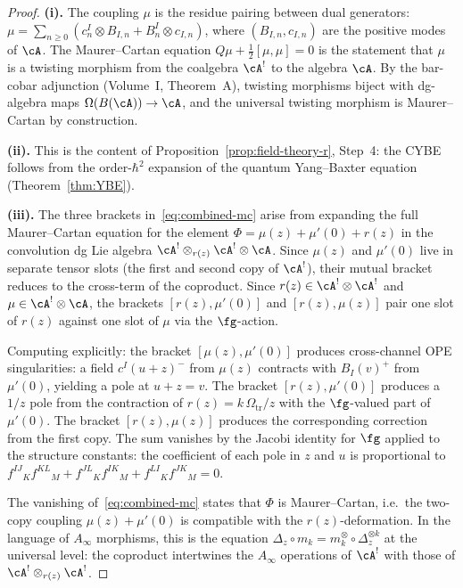 \begin{proof}
\textbf{(i).}
The coupling $\mu$ is the residue pairing between dual generators:
$\mu = \sum_{n \ge 0}(c^I_n \otimes B_{I,n} + B^I_n \otimes c_{I,n})$,
where $(B_{I,n}, c_{I,n})$ are the positive modes of $\cA$.
The Maurer--Cartan equation $Q\mu + \tfrac{1}{2}[\mu, \mu] = 0$ is
the statement that $\mu$ is a twisting morphism from the coalgebra
$\cA^!$ to the algebra $\cA$. By the bar-cobar adjunction
(Volume~I, Theorem~A), twisting morphisms biject with
dg-algebra maps $\Omega(B(\cA)) \to \cA$, and the universal
twisting morphism is Maurer--Cartan by construction.

\smallskip\noindent
\textbf{(ii).}
This is the content of
Proposition~\ref{prop:field-theory-r}, Step~4: the CYBE follows
from the order-$\hbar^2$ expansion of the quantum Yang--Baxter
equation (Theorem~\ref{thm:YBE}).

\smallskip\noindent
\textbf{(iii).}
The three brackets in~\eqref{eq:combined-mc} arise from expanding
the full Maurer--Cartan equation for the element
$\Phi = \mu(z) + \mu'(0) + r(z)$ in the convolution dg Lie
algebra $\cA^! \otimes_{r(z)} \cA^! \otimes \cA$.
Since $\mu(z)$ and $\mu'(0)$ live in separate tensor slots (the
first and second copy of $\cA^!$), their mutual bracket reduces to
the cross-term of the coproduct. Since $r(z) \in \cA^! \otimes \cA^!$
and $\mu \in \cA^! \otimes \cA$, the brackets
$[r(z), \mu'(0)]$ and $[r(z), \mu(z)]$ pair one slot of $r(z)$
against one slot of $\mu$ via the $\fg$-action.

Computing explicitly: the bracket $[\mu(z), \mu'(0)]$ produces
cross-channel OPE singularities: a field $c^I(u+z)^-$ from
$\mu(z)$ contracts with $B_I(v)^+$ from $\mu'(0)$, yielding a
pole at $u + z = v$. The bracket $[r(z), \mu'(0)]$ produces a
$1/z$ pole from the contraction of $r(z) = k\,\Omega_{\mathrm{tr}}/z$ with the
$\fg$-valued part of $\mu'(0)$. The bracket $[r(z), \mu(z)]$
produces the corresponding correction from the first copy.
The sum vanishes by the Jacobi identity for $\fg$ applied to the
structure constants: the coefficient of each pole in $z$ and $u$
is proportional to
$f^{IJ}{}_K f^{KL}{}_M + f^{JL}{}_K f^{IK}{}_M
+ f^{LI}{}_K f^{JK}{}_M = 0$.

The vanishing of~\eqref{eq:combined-mc} states that $\Phi$ is
Maurer--Cartan, i.e.\ the two-copy coupling
$\mu(z) + \mu'(0)$ is compatible with the $r(z)$-deformation.
In the language of $A_\infty$ morphisms, this is the
equation $\Delta_z \circ m_k = m_k^{\otimes} \circ \Delta_z^{\otimes k}$
at the universal level: the coproduct intertwines the $A_\infty$
operations of $\cA^!$ with those of
$\cA^! \otimes_{r(z)} \cA^!$.
\end{proof}

